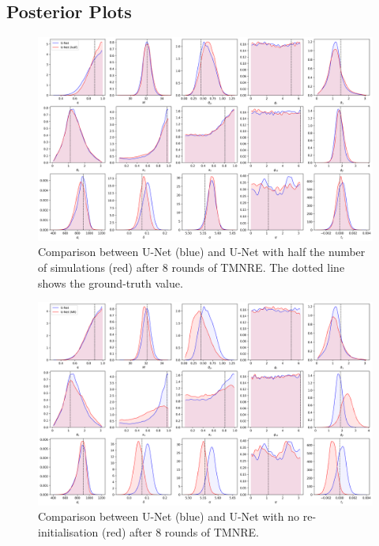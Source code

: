 \onecolumn

\appendix
\begin{appendices}

\section{Posterior Plots}
\label{sec:apx:posterior_plots}

\begin{figure}[htb]
  \centering
  \includegraphics[width=0.835\linewidth]{media/images/Posteriors_UNet_original_half_round_8.png}
  \caption{Comparison between U-Net (blue) and U-Net with half the number of simulations (red) after 8 rounds of TMNRE. The dotted line shows the ground-truth value.}
  \label{fig:posterior_unet_half}
\end{figure}

\begin{figure}[htb]
  \centering
  \includegraphics[width=0.835\linewidth]{media/images/Posteriors_UNet_NoReinit_round_8.png}
  \caption{Comparison between U-Net (blue) and U-Net with no re-initialisation (red) after 8 rounds of TMNRE.}
  \label{fig:posterior_unet_noreinit}
\end{figure}


\end{appendices}

